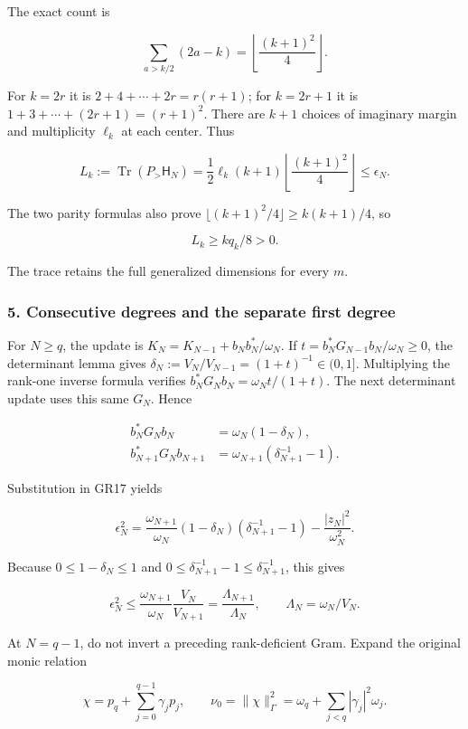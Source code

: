 \documentclass{article}
\begin{document}
The exact count is

\[
\sum_{a>k/2}(2a-k)=\left\lfloor\frac{(k+1)^2}{4}\right\rfloor.
\tag{GR19}
\]

For \(k=2r\) it is \(2+4+\cdots+2r=r(r+1)\); for \(k=2r+1\) it is \(1+3+\cdots+(2r+1)=(r+1)^2\). There are \(k+1\) choices of imaginary margin and multiplicity \(\ell_k\) at each center. Thus

\[
L_k:=\operatorname{Tr}(P_>\mathsf H_N)
=\frac12\ell_k(k+1)\left\lfloor\frac{(k+1)^2}{4}\right\rfloor
\le\epsilon_N.
\tag{GR20}
\]

The two parity formulas also prove \(\lfloor(k+1)^2/4\rfloor\ge k(k+1)/4\), so

\[
L_k\ge kq_k/8>0.
\tag{GR21}
\]

The trace retains the full generalized dimensions for every \(m\).

\subsubsection{5. Consecutive degrees and the separate first degree}\label{endpoint-gamma_review--consecutive-degrees-and-the-separate-first-degree}

For \(N\ge q\), the update is \(K_N=K_{N-1}+b_Nb_N^*/\omega_N\). If \(t=b_N^*G_{N-1}b_N/\omega_N\ge0\), the determinant lemma gives \(\delta_N:=V_N/V_{N-1}=(1+t)^{-1}\in(0,1]\). Multiplying the rank-one inverse formula verifies \(b_N^*G_Nb_N=\omega_Nt/(1+t)\). The next determinant update uses this same \(G_N\). Hence

\[
\begin{aligned}
b_N^*G_Nb_N&=\omega_N(1-\delta_N),\\
b_{N+1}^*G_Nb_{N+1}&=\omega_{N+1}(\delta_{N+1}^{-1}-1).
\end{aligned}
\tag{GR22}
\]

Substitution in GR17 yields

\[
\epsilon_N^2=
\frac{\omega_{N+1}}{\omega_N}(1-\delta_N)(\delta_{N+1}^{-1}-1)
-\frac{|z_N|^2}{\omega_N^2}.
\tag{GR23}
\]

Because \(0\le1-\delta_N\le1\) and \(0\le\delta_{N+1}^{-1}-1\le\delta_{N+1}^{-1}\), this gives

\[
\epsilon_N^2\le
\frac{\omega_{N+1}}{\omega_N}\frac{V_N}{V_{N+1}}
=\frac{\Lambda_{N+1}}{\Lambda_N},
\qquad \Lambda_N=\omega_N/V_N.
\tag{GR24}
\]

At \(N=q-1\), do not invert a preceding rank-deficient Gram. Expand the original monic relation

\[
\chi=p_q+\sum_{j=0}^{q-1}\gamma_jp_j,\qquad
\nu_0=\|\chi\|_\Gamma^2=\omega_q+\sum_{j<q}|\gamma_j|^2\omega_j.
\tag{GR25}
\]
\end{document}
